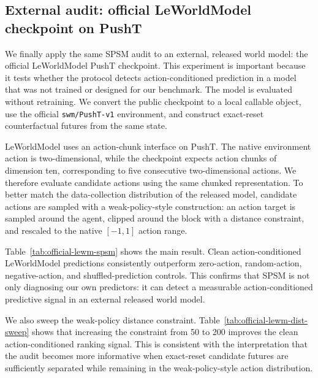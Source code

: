 \subsection{External audit: official LeWorldModel checkpoint on PushT}

We finally apply the same SPSM audit to an external, released world model: the official LeWorldModel PushT checkpoint. This experiment is important because it tests whether the protocol detects action-conditioned prediction in a model that was not trained or designed for our benchmark. The model is evaluated without retraining. We convert the public checkpoint to a local callable object, use the official \texttt{swm/PushT-v1} environment, and construct exact-reset counterfactual futures from the same state.

LeWorldModel uses an action-chunk interface on PushT. The native environment action is two-dimensional, while the checkpoint expects action chunks of dimension ten, corresponding to five consecutive two-dimensional actions. We therefore evaluate candidate actions using the same chunked representation. To better match the data-collection distribution of the released model, candidate actions are sampled with a weak-policy-style construction: an action target is sampled around the agent, clipped around the block with a distance constraint, and rescaled to the native $[-1,1]$ action range.

Table~\ref{tab:official-lewm-spsm} shows the main result. Clean action-conditioned LeWorldModel predictions consistently outperform zero-action, random-action, negative-action, and shuffled-prediction controls. This confirms that SPSM is not only diagnosing our own predictors: it can detect a measurable action-conditioned predictive signal in an external released world model.



We also sweep the weak-policy distance constraint. Table~\ref{tab:official-lewm-dist-sweep} shows that increasing the constraint from 50 to 200 improves the clean action-conditioned ranking signal. This is consistent with the interpretation that the audit becomes more informative when exact-reset candidate futures are sufficiently separated while remaining in the weak-policy-style action distribution.


